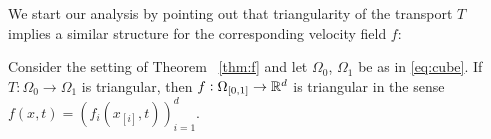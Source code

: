   We start our analysis by pointing out that triangularity of the
  transport $T$ implies a similar structure for the corresponding
  velocity field $f$:
  \begin{lemma}
    Consider the setting of Theorem ~\ref{thm:f} and let $\Omega_0$,
    $\Omega_1$ be as in \eqref{eq:cube}. If $T:\Omega_0\to\Omega_1$ is
    triangular, then $f:\Omega_{[0,1]}\to\mathbb{R}^d$ is triangular in the
    sense $f(x,t)=(f_i(x_{[i]},t))_{i=1}^d$.
  \end{lemma}
 
